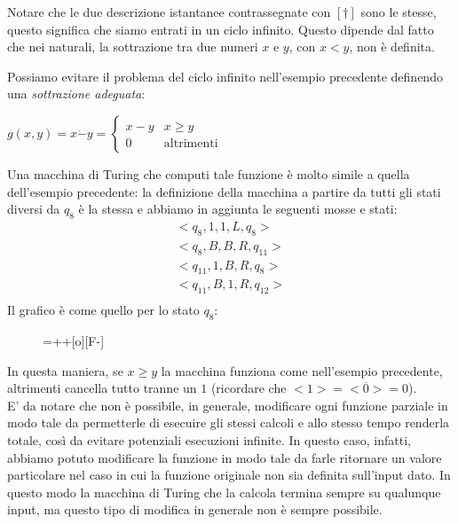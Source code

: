 \begin{esempio}[Sottrazione]
Notare che le due descrizione istantanee contrassegnate con $[\dag]$
sono le stesse, questo significa che siamo entrati in un ciclo
infinito. Questo dipende dal fatto che nei naturali, la sottrazione
tra due numeri $x$ e $y$, con $x<y$, non \`e definita.\\
\end{esempio}


\begin{esempio}
Possiamo evitare il problema del ciclo infinito nell'esempio
precedente definendo una \textsl{sottrazione adeguata}:\\
\begin{center}
$g(x,y)=x\dot{-} y=
\left\{ \begin{array}{ll}
x-y &  x \geq y\\
0 & \textrm{altrimenti}
\end{array} \right.$
\end{center}
Una macchina di Turing che computi tale funzione \`e molto simile a
quella dell'esempio precedente: la definizione della macchina a
partire da tutti gli stati diversi da $q_{8}$ \`e la stessa e abbiamo
in aggiunta le seguenti mosse e stati:
\begin{eqnarray*}
&<q_{8},1,1,L,q_{8}>&\\
&<q_{8},B,B,R,q_{11}>&\\
&<q_{11},1,B,R,q_{8}>&\\
&<q_{11},B,1,R,q_{12}>&\\
\end{eqnarray*}
Il grafico \`e come quello per lo stato $q_{8}$:
\begin{figure}[hbtp]
\hspace{0cm} \entrymodifiers={++[o][F-]} \end{figure}\par
In questa maniera, se $x\geq y$ la macchina funziona come nell'esempio
precedente, altrimenti cancella tutto tranne un $1$ (ricordare che
$<1>=<\overline{0}>=0$).\\

E' da notare che non \`e possibile, in generale, modificare ogni
funzione parziale in modo tale da permetterle di esecuire gli stessi
calcoli e allo stesso tempo renderla totale, cos\`i da evitare
potenziali esecuzioni infinite. In questo caso, infatti, abbiamo
potuto modificare la funzione in modo tale da farle ritornare un
valore particolare nel caso in cui la funzione originale non sia
definita sull'input dato. In questo modo la macchina di Turing che la
calcola termina sempre su qualunque input, ma questo tipo di modifica
in generale non \`e sempre possibile.\\
\end{esempio}

